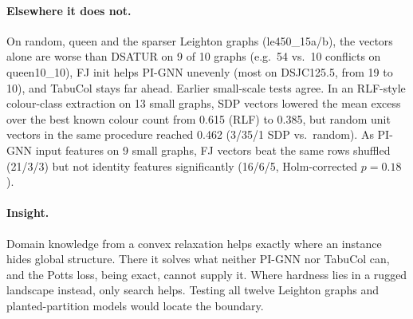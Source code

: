 \documentclass[11pt]{article}
\begin{document}
\paragraph{Elsewhere it does not.} On random, queen and the sparser Leighton graphs (le450\_15a/b),
the vectors alone are worse than DSATUR on 9 of 10 graphs (e.g.\ 54 vs.\ 10 conflicts on
queen10\_10), FJ init helps PI-GNN unevenly (most on DSJC125.5, from 19 to 10), and TabuCol stays far
ahead. Earlier small-scale tests agree. In an RLF-style colour-class extraction on 13 small graphs,
SDP vectors lowered the mean excess over the best known colour count from 0.615 (RLF) to 0.385, but
random unit vectors in the same procedure reached 0.462 (3/35/1 SDP vs.\ random). As PI-GNN input
features on 9 small graphs, FJ vectors beat the same rows shuffled (21/3/3) but not identity features
significantly (16/6/5, Holm-corrected $p=0.18$).

\paragraph{Insight.} Domain knowledge from a convex relaxation helps exactly where an instance hides
global structure. There it solves what neither PI-GNN nor TabuCol can, and the Potts loss, being
exact, cannot supply it. Where hardness lies in a rugged landscape instead, only search helps.
Testing all twelve Leighton graphs and planted-partition models would locate the boundary.



\end{document}
